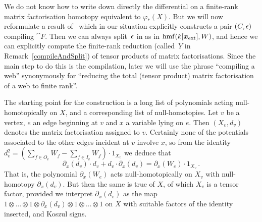 \documentclass{compositio}
\theoremstyle{definition}
\numberwithin{equation}{section}
\DeclareMathOperator{\hmf}{hmf}
\begin{document}
We do not know how to write down directly the differential on a finite-rank matrix factorisation homotopy equivalent to $\varphi_*(X)$. But we will now reformulate a result of~\cite{dm1102.2957} which in our situation explicitly constructs a pair $(C, \epsilon)$ compiling $\cat{F}$. Then we can always split~$\epsilon$ in as in $\hmf(k[\extvar],W)$, and hence we can explicitly compute the finite-rank reduction (called~$Y$ in Remark~\ref{compileAndSplit}) of tensor products of matrix factorisations. Since the main step to do this is the compilation, later we will use the phrase ``compiling a web'' synonymously for ``reducing the total (tensor product) matrix factorisation of a web to finite rank''. 

The starting point for the construction is a long list of polynomials acting null-homotopically on $X$, and a corresponding list of null-homotopies. Let $v$ be a vertex, $e$ an edge beginning at $v$ and $x$ a variable lying on $e$. Then $(X_v, d_v)$ denotes the matrix factorisation assigned to $v$. Certainly none of the potentials associated to the other edges incident at $v$ involve $x$, so from the identity $d_v^2 = (\sum_{f \in O_v} W_f - \sum_{f \in I_v} W_f) \cdot 1_{X_v}$ we deduce that
\[
\partial_x(d_v) \cdot d_v + d_v \cdot \partial_x(d_v) = \partial_x(W_e) \cdot 1_{X_v}\,.
\]
That is, the polynomial $\partial_x(W_e)$ acts null-homotopically on $X_v$ with null-homotopy $\partial_x(d_v)$. But then the same is true of $X$, of which $X_v$ is a tensor factor, provided we interpret $\partial_x(d_v)$ as the map $1 \otimes \ldots \otimes 1\otimes \partial_x(d_v) \otimes 1\otimes \ldots \otimes 1$ on $X$ with suitable factors of the identity inserted, and Koszul signs.
\end{document}
